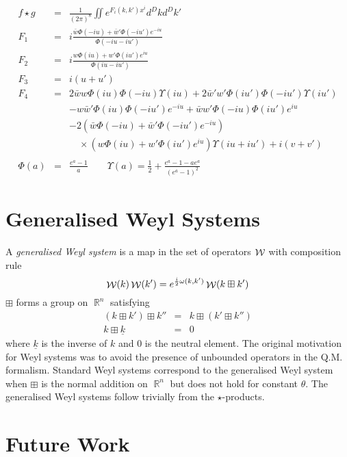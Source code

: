 \documentclass[a4,12pt,titlepage]{seminar}
\DeclareMathOperator{\weyl}{{\cal W}}                   %
\DeclareMathOperator{\real}{{\mathbb R}}                %
\newcommand{\comp}{\boxplus}                            %
\begin{document}
\begin{eqnarray*}
  f\star g&=&\frac{1}{(2\pi)^{8}}\iint
  e^{F_i(k,k')x^i}d^Dkd^Dk'\\ \nonumber
  F_1&=&i\frac{\bar{w}\Phi(-iu)+\bar{w}'\Phi(-iu')e^{-i u}}{\Phi(-iu-iu')}\\
  \nonumber
  F_2&=&i\frac{w\Phi(iu)+w'\Phi(iu')e^{i u}}{\Phi(iu-iu')}\\
  \nonumber
  F_3&=&i(u+u')\\ \nonumber
  F_4&=&2\bar{w}w\Phi(iu)\Phi(-iu)\Upsilon(iu)
  +2\bar{w}'w'\Phi(iu')\Phi(-iu')\Upsilon(iu')\\ \nonumber
  &&-w\bar{w}'\Phi(iu)\Phi(-iu')e^{-i u}
  +\bar{w}w'\Phi(-iu)\Phi(iu')e^{i u}\\ \nonumber
  &&-2\left(\bar{w}\Phi(-iu)+\bar{w}'\Phi(-iu')e^{-i u}\right)\\ \nonumber
  &&\quad\!\!\!\times\left(w\Phi(iu)+w'\Phi(iu')e^{i
      u}\right)\Upsilon(iu+iu')+i(v+v')\\\\
  \Phi(a)&=&\frac{e^{ a}-1}a
  \qquad
  \Upsilon(a)=\frac 12 +\frac{e^{ a}-1- a
    e^{ a}}
  {\left(e^{ a}-1\right)^2}
\end{eqnarray*}

\clearpage
\section{Generalised Weyl Systems}

A \textit{generalised Weyl system} is a map in the set of operators $\weyl$ with
composition rule
\begin{equation*}
  \weyl(k)\weyl(k')=e^{\frac i2\omega(k,k')}\weyl(k\comp k')
\end{equation*}
$\comp$ forms a group on $\real^n$ satisfying
\begin{eqnarray*}
  (k\comp k')\comp k'' &=& k\comp(k'\comp k'') \\
  k\comp \underline k &=& 0
\end{eqnarray*}
where $\underline k$ is the inverse of $k$ and $0$ is the neutral element. The
original motivation for Weyl systems was to avoid the presence of unbounded
operators in the Q.M. formalism. Standard Weyl systems correspond to the
generalised Weyl system when $\comp$ is the normal addition on $\real^n$ but
does not hold for constant $\theta$. The generalised Weyl systems follow
trivially from the $\star$-products.

\clearpage
\section{Future Work}
\end{document}
